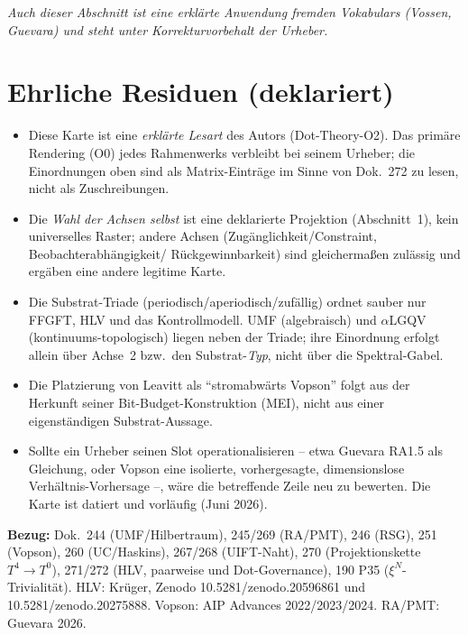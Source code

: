 \medskip\noindent\emph{Auch dieser Abschnitt ist eine erklärte Anwendung fremden Vokabulars
(Vossen, Guevara) und steht unter Korrekturvorbehalt der Urheber.}

\section{Ehrliche Residuen (deklariert)}

\begin{itemize}
  \item Diese Karte ist eine \emph{erklärte Lesart} des Autors (Dot-Theory-O2). Das primäre
        Rendering (O0) jedes Rahmenwerks verbleibt bei seinem Urheber; die Einordnungen oben
        sind als Matrix-Einträge im Sinne von Dok.~272 zu lesen, nicht als Zuschreibungen.
  \item Die \emph{Wahl der Achsen selbst} ist eine deklarierte Projektion (Abschnitt~1), kein
        universelles Raster; andere Achsen (Zugänglichkeit/Constraint, Beobachterabhängigkeit/
        Rückgewinnbarkeit) sind gleichermaßen zulässig und ergäben eine andere legitime Karte.
  \item Die Substrat-Triade (periodisch/aperiodisch/zufällig) ordnet sauber nur FFGFT, HLV
        und das Kontrollmodell. UMF (algebraisch) und $\alpha$LGQV
        (kontinuums-topologisch) liegen neben der Triade; ihre Einordnung erfolgt allein über
        Achse~2 bzw.\ den Substrat-\emph{Typ}, nicht über die Spektral-Gabel.
  \item Die Platzierung von Leavitt als \enquote{stromabwärts Vopson} folgt aus der Herkunft
        seiner Bit-Budget-Konstruktion (MEI), nicht aus einer eigenständigen Substrat-Aussage.
  \item Sollte ein Urheber seinen Slot operationalisieren -- etwa Guevara RA1.5 als Gleichung,
        oder Vopson eine isolierte, vorhergesagte, dimensionslose Verhältnis-Vorhersage --,
        wäre die betreffende Zeile neu zu bewerten. Die Karte ist datiert und vorläufig
        (Juni 2026).
\end{itemize}

\noindent\textbf{Bezug:} Dok.~244 (UMF/Hilbertraum), 245/269 (RA/PMT), 246 (RSG),
251 (Vopson), 260 (UC/Haskins), 267/268 (UIFT-Naht), 270 (Projektionskette $T^4\!\to\!T^0$),
271/272 (HLV, paarweise und Dot-Governance), 190 P35 ($\xi^N$-Trivialität).
HLV: Krüger, Zenodo 10.5281/zenodo.20596861 und 10.5281/zenodo.20275888.
Vopson: AIP Advances 2022/2023/2024. RA/PMT: Guevara 2026.
